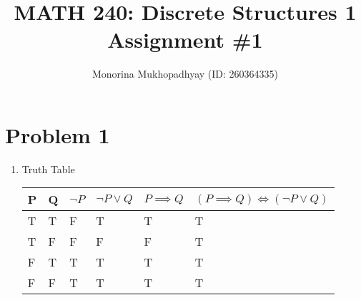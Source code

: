 \documentclass[english]{article}
\title{MATH 240: Discrete Structures 1 Assignment \#1}
\author{Monorina Mukhopadhyay (ID: 260364335)}
\begin{document}
\maketitle
\section*{Problem 1}
\begin{enumerate} [label=\alph*]
\item Truth Table
\begin{table} [!h]
    \begin{tabular}{|l|l|l|l|l|l|}
        \hline
        P & Q & $\lnot P$ & $\lnot P \lor Q$ & $P \implies Q $ & $(P \implies Q ) \iff (\lnot P \lor Q)$ \\ \hline
        T & T & F         & T                & T               & T                                      \\ 
        T & F & F         & F                & F               & T                                      \\ 
        F & T & T         & T                & T               & T                                      \\ 
        F & F & T         & T                & T               & T                                      \\
        \hline
    \end{tabular}
\end{table}


\end{enumerate}
\end{document}
